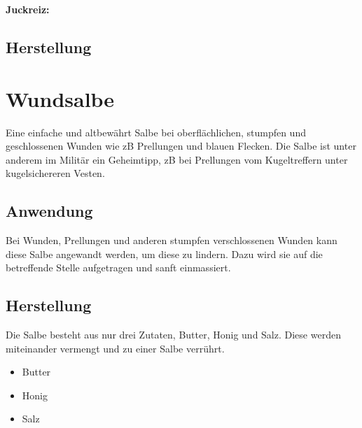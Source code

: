 \textbf{Juckreiz:} \\ 

\subsection{Herstellung}






\newpage




\section{Wundsalbe}

Eine einfache und altbewährt Salbe bei oberflächlichen, stumpfen und geschlossenen Wunden wie zB Prellungen und blauen Flecken. Die Salbe ist unter anderem im Militär ein Geheimtipp, zB bei Prellungen vom Kugeltreffern unter kugelsichereren Vesten.


 

\subsection{Anwendung}

Bei Wunden, Prellungen und anderen stumpfen verschlossenen Wunden kann diese Salbe angewandt werden, um diese zu lindern. Dazu wird sie auf die betreffende Stelle aufgetragen und sanft einmassiert.

\subsection{Herstellung}

Die Salbe besteht aus nur drei Zutaten, Butter, Honig und Salz. Diese werden miteinander vermengt und zu einer Salbe verrührt.

\begin{itemize}
	\item Butter
	\item Honig
	\item Salz
\end{itemize}




